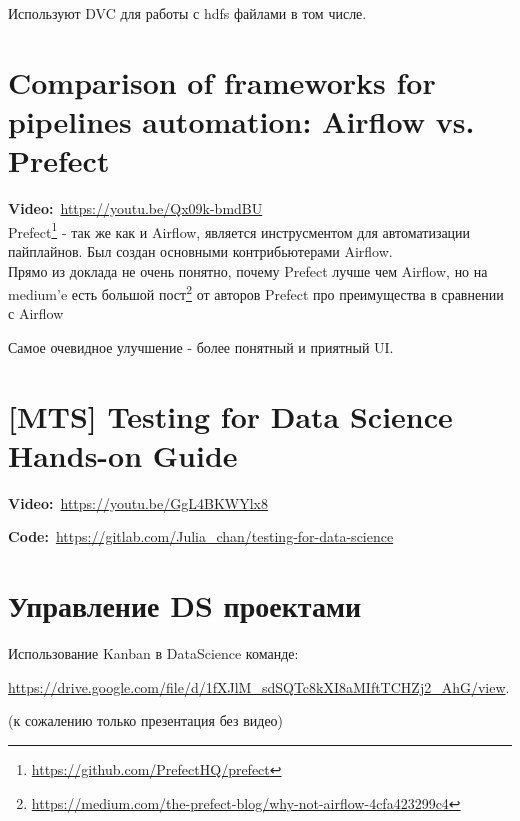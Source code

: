 Используют DVC для работы с hdfs файлами в том числе.

\section{Comparison of frameworks for pipelines automation: Airflow vs. Prefect}

\textbf{Video:}~\url{https://youtu.be/Qx09k-bmdBU} \\

Prefect\footnote{\url{https://github.com/PrefectHQ/prefect}} - так же как и Airflow, является инструсментом для автоматизации пайплайнов.
Был создан основными контрибьютерами Airflow. \\

Прямо из доклада не очень понятно, почему Prefect лучше чем Airflow, но на medium'e есть большой пост\footnote{\url{https://medium.com/the-prefect-blog/why-not-airflow-4cfa423299c4}} от авторов Prefect про преимущества в сравнении с Airflow

Самое очевидное улучшение - более понятный и приятный UI.

\section{[MTS] Testing for Data Science Hands-on Guide}
\label{sec:testing_ds}

\textbf{Video:}~\url{https://youtu.be/GgL4BKWYlx8} 

\textbf{Code:}~\url{https://gitlab.com/Julia_chan/testing-for-data-science} \\



\spacerule


\spacerule

\section*{Управление DS проектами}

Использование Kanban в DataScience команде:

\url{https://drive.google.com/file/d/1fXJlM_sdSQTc8kXI8aMIftTCHZj2_AhG/view}.

(к сожалению только презентация без видео)